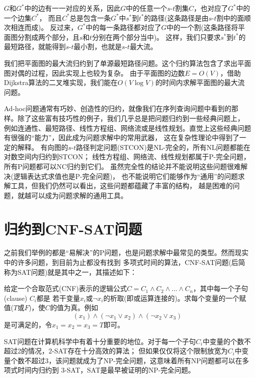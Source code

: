 $G$和$G^*$中的边有一一对应的关系，因此$G$中的任意一个$s$-$t$割集$C$，也对应了$G^*$中的一个边集$C^*$，
而且$C^*$总是包含一条$G^*$中$s^*$到$t^*$的路径(这条路径是由$s$-$t$割中的面顺次相连而成)。
反过来，$G^*$中的每一条路径都对应了$G$中的一个割(这条路径将平面图分割成两个部分，且$s$和$t$分别在两个部分当中)。
这样，我们只要求$s^*$到$t^*$的最短路径，就能得到$s$-$t$最小割，也就是$s$-$t$最大流。

我们把平面图的最大流归约到了单源最短路径问题。这个归约算法包含了求出平面图对偶的过程，因此实现上也较为复杂。
由于平面图的边数$E=O(V)$，借助Dijkstra算法的二叉堆实现，我们能在$O(V\log V)$的时间内求解平面图的最大流问题。

Ad-hoc问题通常有巧妙、创造性的归约，就像我们在序列查询问题中看到的那样。除了这些富有技巧性的例子，我们几乎总是把问题归约到一些经典问题上，
例如连通性、最短路径、线性方程组、网络流或是线性规划。直觉上这些经典问题有很强的``能力''，因此成为问题求解中的常用武器，
这在复杂性理论中得到了一定的解释。
有向图的$s$-$t$路径判定问题(STCON)是NL-完全的，所有NL问题都能在对数空间内归约到STCON；
线性方程组、网络流、线性规划都属于P-完全问题，所有P问题都可以NC归约到它们。
虽然完全性的结论并不能说明这些问题很难解决(逻辑表达式求值也是P-完全问题)，
也不能说明它们能够作为``通用''的问题求解工具，但我们仍然可以看出，这些问题都蕴藏了丰富的结构，
越是困难的问题，就越可以成为问题求解的通用工具。


\section{归约到CNF-SAT问题}

之前我们举例的都是``易解决''的P问题，也是问题求解中最常见的类型。然而现实中的许多问题，到目前为止都没有找到
多项式时间的算法，CNF-SAT问题(后简称为SAT问题)就是其中之一，其描述如下：

\begin{prob}
 给定一个合取范式(CNF)表示的逻辑公式$C = C_1 \land C_2 \land \ldots \land C_n$，其中每一个子句(clause) $C_i$都是
 若干变量$x_i$或$\neg x_i$的析取(即或运算连接的)。求每个变量的一个赋值($T$或$F$)，使$C$的值为真。例如
 $$(x_1)\land(\neg x_1 \lor x_2)\land(\neg x_2 \lor x_3)$$
 是可满足的，令$x_1=x_2=x_3=T$即可。
\end{prob}

SAT问题在计算机科学中有着十分重要的地位。对于每一个子句$C_i$中变量的个数不超过2的情况，2-SAT存在十分高效的算法；
但如果仅仅将这个限制放宽为$C_i$中变量个数不超过3，该问题就成为了NP-完全问题，这意味着所有NP问题都可以在多项式时间内归约到
3-SAT，SAT是最早被证明的NP-完全问题。

